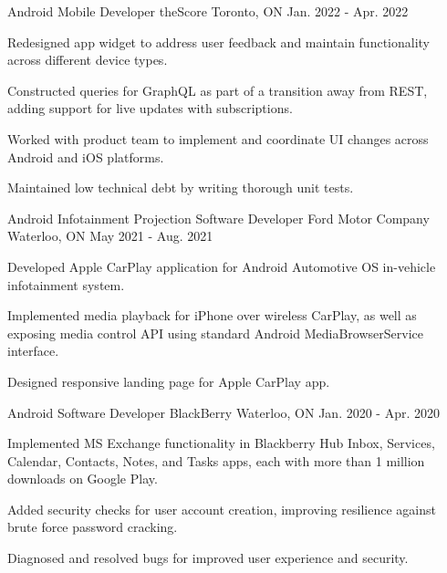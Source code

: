 \begin{cventries}
  \cventry
    {Android Mobile Developer} %
    {theScore} %
    {Toronto, ON} %
    {Jan. 2022 - Apr. 2022} %
    {
      \begin{cvitems} %
        \item {Redesigned app widget to address user feedback and maintain functionality across different device types.}
        \item {Constructed queries for GraphQL as part of a transition away from REST, adding support for live updates with subscriptions.}
        \item {Worked with product team to implement and coordinate UI changes across Android and iOS platforms.}
        \item {Maintained low technical debt by writing thorough unit tests.}
      \end{cvitems}
    }

  \cventry
    {Android Infotainment Projection Software Developer} %
    {Ford Motor Company} %
    {Waterloo, ON} %
    {May 2021 - Aug. 2021} %
    {
      \begin{cvitems} %
        \item {Developed Apple CarPlay application for Android Automotive OS in-vehicle infotainment system.}
        \item {Implemented media playback for iPhone over wireless CarPlay, as well as exposing media control API using standard Android MediaBrowserService interface.}
        \item {Designed responsive landing page for Apple CarPlay app.}
      \end{cvitems}
    }

  \cventry
    {Android Software Developer} %
    {BlackBerry} %
    {Waterloo, ON} %
    {Jan. 2020 - Apr. 2020} %
    {
      \begin{cvitems} %
        \item {Implemented MS Exchange functionality in Blackberry Hub Inbox, Services, Calendar, Contacts, Notes, and Tasks apps, each with more than 1 million downloads on Google Play.}
        \item {Added security checks for user account creation, improving resilience against brute force password cracking.}
        \item {Diagnosed and resolved bugs for improved user experience and security.}
      \end{cvitems}
    }

\end{cventries}
